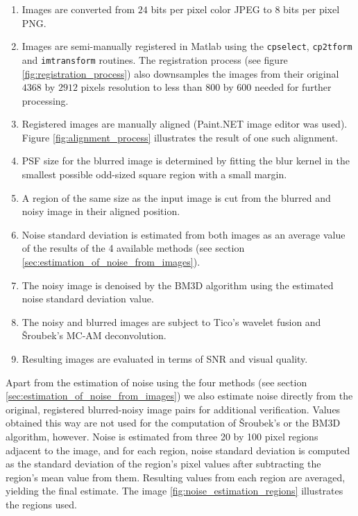 \documentclass[12pt,notitlepage]{report}
\begin{document}
\begin{enumerate}
\item Images are converted from $24$ bits per pixel color JPEG to $8$ bits per pixel PNG.
\item Images are semi-manually registered in Matlab using the \texttt{cpselect}, \texttt{cp2tform} and \texttt{imtransform} routines. The registration process (see figure \ref{fig:registration_process}) also downsamples the images from their original $4368$ by $2912$ pixels resolution to less than $800$ by $600$ needed for further processing. 
\item Registered images are manually aligned (Paint.NET image editor was used). Figure \ref{fig:alignment_process} illustrates the result of one such alignment.
\item PSF size for the blurred image is determined by fitting the blur kernel in the smallest possible odd-sized square region with a small margin.
\item A region of the same size as the input image is cut from the blurred and noisy image in their aligned position.
\item Noise standard deviation is estimated from both images as an average value of the results of the 4 available methods (see section \ref{sec:estimation_of_noise_from_images}).
\item The noisy image is denoised by the BM3D algorithm using the estimated noise standard deviation value.
\item The noisy and blurred images are subject to Tico's wavelet fusion and Šroubek's MC-AM deconvolution.
\item Resulting images are evaluated in terms of SNR and visual quality.
\end{enumerate}

Apart from the estimation of noise using the four methods (see section \ref{sec:estimation_of_noise_from_images}) we also estimate noise directly from the original, registered  blurred-noisy image pairs for additional verification. Values obtained this way are not used for the computation of Šroubek's or the BM3D algorithm, however. Noise is estimated from three 20 by 100 pixel regions adjacent to the image, and for each region, noise standard deviation is computed as the standard deviation of the region's pixel values after subtracting the region's mean value from them. Resulting values from each region are averaged, yielding the final estimate. The image \ref{fig:noise_estimation_regions} illustrates the regions used. 
\end{document}
